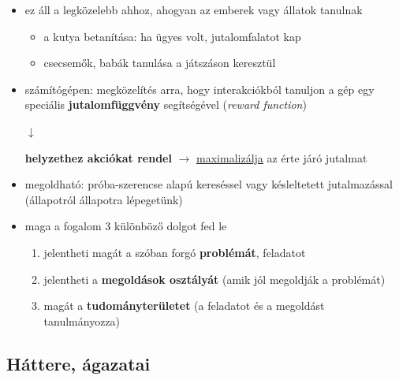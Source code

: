 \documentclass[a4paper, 11pt]{article}
\begin{document}
\begin{itemize}
	\item ez áll a legközelebb ahhoz, ahogyan az emberek vagy állatok tanulnak
	\begin{itemize}
		\item a kutya betanítása: ha ügyes volt, jutalomfalatot kap
		\item csecsemők, babák tanulása a játszáson keresztül
	\end{itemize}
	\item számítógépen: megközelítés arra, hogy interakciókból tanuljon a gép egy speciális \textbf{jutalomfüggvény} segítségével (\textit{reward function})
	\begin{center}
		$\downarrow$ ~~~~~~~~~~~~~~~~~~~~~~~~~~~~~~~~~~~~~~~~~~~~~~~~~~~
		
		\textbf{helyzethez akciókat rendel} $\to$ \underline{maximalizálja} az érte járó jutalmat
	\end{center}
	\item megoldható: próba-szerencse alapú kereséssel vagy késleltetett jutalmazással (állapotról állapotra lépegetünk)
	\item maga a fogalom 3 különböző dolgot fed le
	\begin{enumerate}
		\item jelentheti magát a szóban forgó \textbf{problémát}, feladatot
		\item jelentheti a \textbf{megoldások osztályát} (amik jól megoldják a problémát)
		\item magát a \textbf{tudományterületet} (a feladatot és a megoldást tanulmányozza)
	\end{enumerate}
\end{itemize}

\subsection{Háttere, ágazatai}
\end{document}
